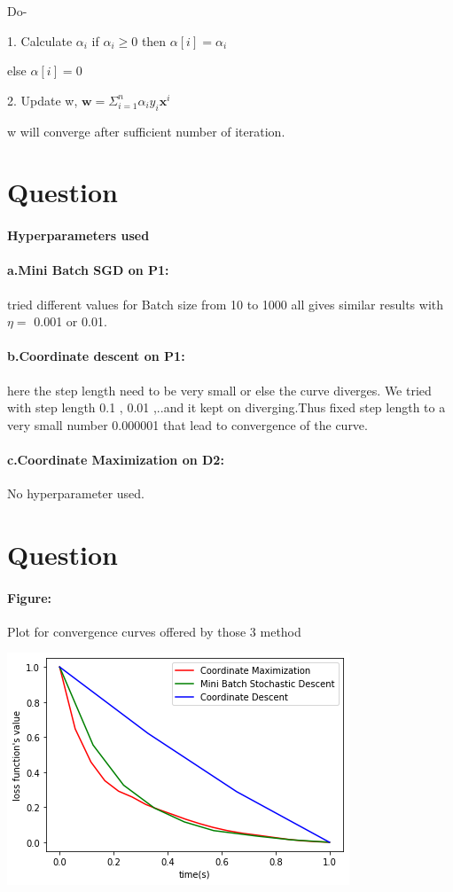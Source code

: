 \documentclass{article}
\begin{document}
\medskip
   
 
  Do- 
     
     1. Calculate $ \alpha _i $ if $ \alpha _i \geq 0 $ then $ \alpha [i] = \alpha _i $
 
       else $ \alpha [i] = 0$
 
      2. Update w, $ \textbf{w} = \Sigma _{i=1} ^n \alpha _i y_i \textbf{x} ^i $
  
w will converge after sufficient number of iteration.   
   
   
   
\section{Question}
\paragraph{Hyperparameters used}
\paragraph{a.Mini Batch SGD on P1:}tried different values for Batch size from 10 to 1000 all gives similar results with $ \eta =$ 0.001 or 0.01.

\paragraph{b.Coordinate descent on P1:}here the step length need to be very small or else the curve diverges. We tried with step length 0.1 , 0.01 ,..and it kept on diverging.Thus fixed step length to a very small number 0.000001 that lead to convergence of the curve. 

\paragraph{c.Coordinate Maximization on D2:}No hyperparameter used.


\section{Question}
\paragraph{Figure:}Plot for convergence curves offered by those 3 method

\includegraphics{converge}
\end{document}

